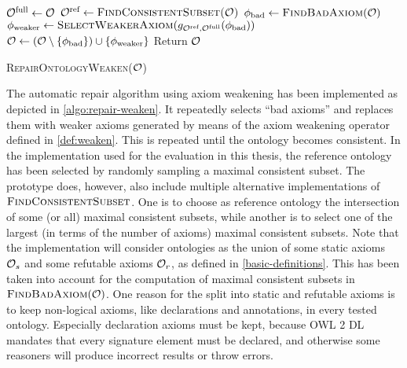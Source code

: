 \begin{algorithm}[ht]
  \begin{algorithmic}
    \State ${\mathcal{O}^\textnormal{full}} \gets \mathcal{O}$
    \State ${\mathcal{O}^\textnormal{ref}} \gets \textsc{FindConsistentSubset(\ensuremath{\mathcal{O}})}$
      \State $\phi_\textnormal{bad} \gets \textsc{FindBadAxiom}(\mathcal{O})$
      \State $\phi_\textnormal{weaker} \gets \textsc{SelectWeakerAxiom}(g_{{\mathcal{O}^\textnormal{ref}},{\mathcal{O}^\textnormal{full}}}(\phi_\textnormal{bad}))$
      \State $\mathcal{O} \gets (\mathcal{O} \setminus \{\phi_\textnormal{bad}\}) \cup \{\phi_\textnormal{weaker}\}$
    \EndWhile
    \State Return $\mathcal{O}$
  \end{algorithmic}
  \caption{\textsc{RepairOntologyWeaken}($\mathcal{O}$)}
  \label{algo:repair-weaken}
\end{algorithm}

The automatic repair algorithm using axiom weakening has been implemented as depicted in \cref{algo:repair-weaken}. It repeatedly selects ``bad axioms'' and replaces them with weaker axioms generated by means of the axiom weakening operator defined in \cref{def:weaken}. This is repeated until the ontology becomes consistent. In the implementation used for the evaluation in this thesis, the reference ontology has been selected by randomly sampling a maximal consistent subset. The prototype does, however, also include multiple alternative implementations of $\textsc{FindConsistentSubset}$. One is to choose as reference ontology the intersection of some (or all) maximal consistent subsets, while another is to select one of the largest (in terms of the number of axioms) maximal consistent subsets. Note that the implementation will consider ontologies as the union of some static axioms $\mathcal{O}_s$ and some refutable axioms $\mathcal{O}_r$, as defined in \cref{basic-definitions}. This has been taken into account for the computation of maximal consistent subsets in $\textsc{FindBadAxiom}(\mathcal{O})$. One reason for the split into static and refutable axioms is to keep non-logical axioms, like declarations and annotations, in every tested ontology. Especially declaration axioms must be kept, because OWL 2 DL mandates that every signature element must be declared, and otherwise some reasoners will produce incorrect results or throw errors.

